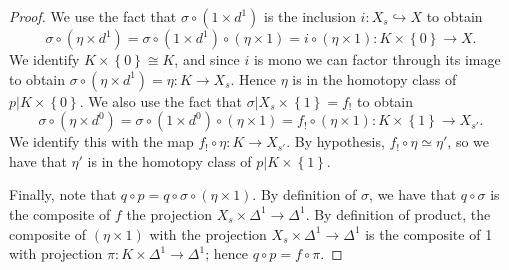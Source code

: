 \begin{proof}
	We use the fact that $\sigma \circ (1\times d^1)$ is the inclusion $i : X_s\hookrightarrow X$ to obtain
	\[
		\sigma \circ (\eta \times d^1) = \sigma \circ (1\times d^1)\circ (\eta \times 1) = i \circ (\eta \times 1) : K\times \left\{ 0 \right\}  \to X
	.\]
	We identify $K\times \left\{ 0 \right\} \cong K$, and since $i$ is mono we can factor through its image to obtain $\sigma \circ (\eta \times d^1) = \eta : K \to X_s$. Hence $\eta $ is in the homotopy class of $p|K\times \left\{ 0 \right\} $. We also use the fact that $\sigma |X_s\times \left\{ 1 \right\} =f_!$ to obtain
	\[
		\sigma \circ (\eta \times d^0) = \sigma \circ (1\times d^0)\circ (\eta \times 1) = f_! \circ (\eta \times 1): K\times \left\{ 1 \right\}  \to X_{s'} 
	.\]
	We identify this with the map $f_! \circ \eta : K \to X_{s'} $. By hypothesis, $f_! \circ \eta \simeq \eta '$, so we have that $\eta '$ is in the homotopy class of $p|K\times \left\{ 1 \right\} $.

	Finally, note that $q \circ p = q \circ \sigma \circ (\eta \times 1)$. By definition of $\sigma $, we have that $q\circ \sigma $ is the composite of $f$ the projection $X_s \times \Delta ^1\to \Delta ^1$. By definition of product, the composite of $(\eta \times 1)$ with the projection $X_s\times \Delta ^1 \to \Delta ^1$ is the composite of 1 with projection $\pi : K\times \Delta ^1 \to \Delta ^1$; hence $q\circ p = f\circ \pi $.


\end{proof}
